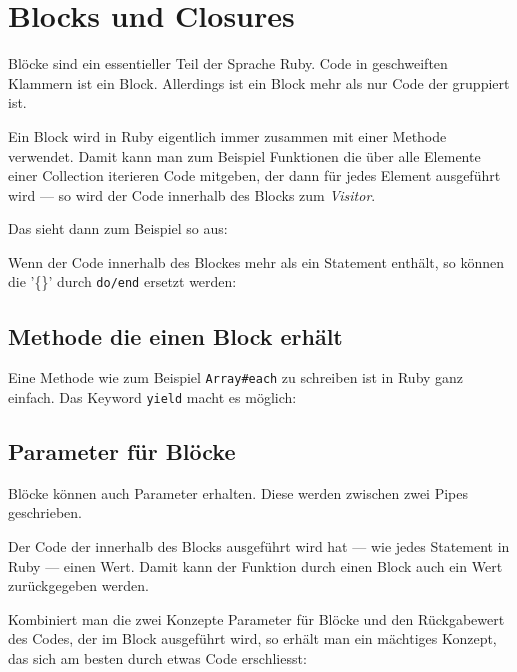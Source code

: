 \documentclass[a4book,11pt,twoside]{scrbook}
\begin{document}
\section{Blocks und Closures} %
\label{sec:blocks_und_closures}
Blöcke sind ein essentieller Teil der Sprache Ruby. Code in geschweiften Klammern ist ein Block. Allerdings ist ein Block mehr als nur Code der gruppiert ist.

Ein Block wird in Ruby eigentlich immer zusammen mit einer Methode verwendet. Damit kann man zum Beispiel Funktionen die über alle Elemente einer Collection iterieren Code mitgeben, der dann für jedes Element ausgeführt wird — so wird der Code innerhalb des Blocks zum \emph{Visitor}.

Das sieht dann zum Beispiel so aus:



Wenn der Code innerhalb des Blockes mehr als ein Statement enthält, so können die '\{\}' durch \texttt{do/end} ersetzt werden:



\subsection*{Methode die einen Block erhält} %
\label{sub:methode_die_einen_block_erhält}
Eine Methode wie zum Beispiel \texttt{Array\#each} zu schreiben ist in Ruby ganz einfach. Das Keyword \texttt{yield} macht es möglich:



\subsection*{Parameter für Blöcke} %
\label{sub:parameter_für_blöcke}
Blöcke können auch Parameter erhalten. Diese werden zwischen zwei Pipes geschrieben.


Der Code der innerhalb des Blocks ausgeführt wird hat — wie jedes Statement in Ruby — einen Wert. Damit kann der Funktion durch einen Block auch ein Wert zurückgegeben werden.

Kombiniert man die zwei Konzepte Parameter für Blöcke und den Rückgabewert des Codes, der im Block ausgeführt wird, so erhält man ein mächtiges Konzept, das sich am besten durch etwas Code erschliesst:


\end{document}
